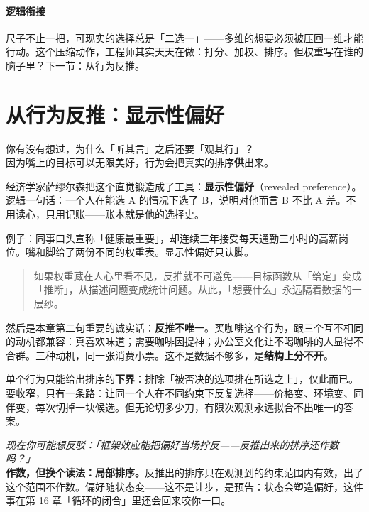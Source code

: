 \documentclass[../../main2.tex]{subfiles}
\begin{document}
\paragraph*{逻辑衔接}
	尺子不止一把，可现实的选择总是「二选一」——多维的想要必须被压回一维才能行动。这个压缩动作，工程师其实天天在做：打分、加权、排序。但权重写在谁的脑子里？下一节：从行为反推。

\section{从行为反推：显示性偏好}

\begin{readingnote}
	你有没有想过，为什么「听其言」之后还要「观其行」？\\
	因为嘴上的目标可以无限美好，行为会把真实的排序\textbf{供}出来。
\end{readingnote}

经济学家萨缪尔森把这个直觉锻造成了工具：\textbf{显示性偏好}（revealed preference）。逻辑一句话：一个人在能选 A 的情况下选了 B，说明对他而言 B 不比 A 差。不用读心，只用记账——账本就是他的选择史。

例子：同事口头宣称「健康最重要」，却连续三年接受每天通勤三小时的高薪岗位。嘴和脚给了两份不同的权重表。显示性偏好只认脚。

\begin{quote}
	如果权重藏在人心里看不见，反推就不可避免——目标函数从「给定」变成「推断」，从描述问题变成统计问题。从此，「想要什么」永远隔着数据的一层纱。
\end{quote}

然后是本章第二句重要的诚实话：\textbf{反推不唯一}。买咖啡这个行为，跟三个互不相同的动机都兼容：真喜欢味道；需要咖啡因提神；办公室文化让不喝咖啡的人显得不合群。三种动机，同一张消费小票。这不是数据不够多，是\textbf{结构上分不开}。

单个行为只能给出排序的\textbf{下界}：排除「被否决的选项排在所选之上」，仅此而已。要收窄，只有一条路：让同一个人在不同约束下反复选择——价格变、环境变、同伴变，每次切掉一块候选。但无论切多少刀，有限次观测永远拟合不出唯一的答案。

\begin{questionbox}
	\textit{现在你可能想反驳：「框架效应能把偏好当场拧反——反推出来的排序还作数吗？」}\\
	\textbf{作数，但换个读法：局部排序。}反推出的排序只在观测到的约束范围内有效，出了这个范围不作数。偏好随状态变——这不是让步，是预告：状态会塑造偏好，这件事在第 16 章「循环的闭合」里还会回来咬你一口。
\end{questionbox}
\end{document}
